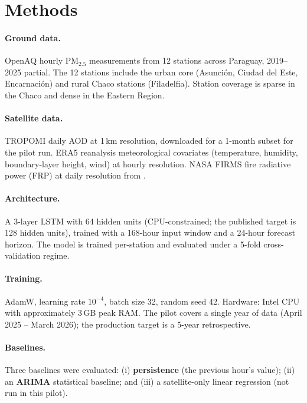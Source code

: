 \section{Methods}
\label{sec:tatakua-methods}

\paragraph{Ground data.} OpenAQ hourly PM$_{2.5}$ measurements from
12 stations across Paraguay, 2019--2025 partial. The 12 stations
include the urban core (Asunci\'on, Ciudad del Este, Encarnaci\'on)
and rural Chaco stations (Filadelfia). Station coverage is sparse in
the Chaco and dense in the Eastern Region.

\paragraph{Satellite data.} TROPOMI daily AOD at 1\,km resolution,
downloaded for a 1-month subset for the pilot run. ERA5 reanalysis
meteorological covariates (temperature, humidity, boundary-layer
height, wind) at hourly resolution. NASA FIRMS fire radiative power
(FRP) at daily resolution from \citep{firms2024}.

\paragraph{Architecture.} A 3-layer LSTM with 64 hidden units
(CPU-constrained; the published target is 128 hidden units), trained
with a 168-hour input window and a 24-hour forecast horizon. The model
is trained per-station and evaluated under a 5-fold cross-validation
regime.

\paragraph{Training.} AdamW, learning rate $10^{-4}$, batch size 32,
random seed 42. Hardware: Intel CPU with approximately 3\,GB peak RAM.
The pilot covers a single year of data (April 2025 -- March 2026);
the production target is a 5-year retrospective.

\paragraph{Baselines.} Three baselines were evaluated: (i)
\textbf{persistence} (the previous hour's value); (ii) an
\textbf{ARIMA} statistical baseline; and (iii) a satellite-only linear
regression (not run in this pilot).

